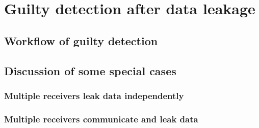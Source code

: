 \section{Guilty detection after data leakage}
\subsection{Workflow of guilty detection}

\subsection{Discussion of some special cases}

\subsubsection{Multiple receivers leak data independently}

\subsubsection{Multiple receivers communicate and leak data}